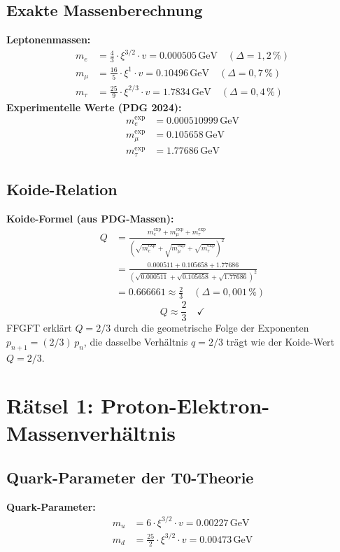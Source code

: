 	\subsection{Exakte Massenberechnung}
	\textbf{Leptonenmassen:}
	\begin{align}
		m_e &= \frac{4}{3} \cdot \xi^{3/2} \cdot v = 0.000505\,\si{\giga\electronvolt} \quad (\Delta = 1{,}2\,\%) \\
		m_\mu &= \frac{16}{5} \cdot \xi^{1} \cdot v = 0.10496\,\si{\giga\electronvolt} \quad (\Delta = 0{,}7\,\%) \\
		m_\tau &= \frac{25}{9} \cdot \xi^{2/3} \cdot v = 1.7834\,\si{\giga\electronvolt} \quad (\Delta = 0{,}4\,\%)
	\end{align}
	\textbf{Experimentelle Werte (PDG 2024):}
	\begin{align}
		m_e^{\text{exp}} &= 0.000510999\,\si{\giga\electronvolt} \\
		m_\mu^{\text{exp}} &= 0.105658\,\si{\giga\electronvolt} \\
		m_\tau^{\text{exp}} &= 1.77686\,\si{\giga\electronvolt}
	\end{align}
	\subsection{Koide-Relation}
	\textbf{Koide-Formel (aus PDG-Massen):}
	\begin{align}
		Q &= \frac{m_e^{\text{exp}} + m_\mu^{\text{exp}} + m_\tau^{\text{exp}}}{(\sqrt{m_e^{\text{exp}}} + \sqrt{m_\mu^{\text{exp}}} + \sqrt{m_\tau^{\text{exp}}})^2} \\
		&= \frac{0.000511 + 0.105658 + 1.77686}{(\sqrt{0.000511} + \sqrt{0.105658} + \sqrt{1.77686})^2} \\
		&= 0.666661 \approx \frac{2}{3} \quad (\Delta = 0{,}001\,\%)
	\end{align}
	\begin{equation}
		Q \approx \frac{2}{3} \quad \checkmark
	\end{equation}
	FFGFT erklärt $Q = 2/3$ durch die geometrische Folge der Exponenten
	$p_{n+1} = (2/3)\,p_n$, die dasselbe Verhältnis $q = 2/3$ trägt
	wie der Koide-Wert $Q = 2/3$.
	\section{Rätsel 1: Proton-Elektron-Massenverhältnis}
	\subsection{Quark-Parameter der T0-Theorie}
	\textbf{Quark-Parameter:}
	\begin{align}
		m_u &= 6 \cdot \xi^{3/2} \cdot v = 0.00227\,\si{\giga\electronvolt} \\
		m_d &= \frac{25}{2} \cdot \xi^{3/2} \cdot v = 0.00473\,\si{\giga\electronvolt}
	\end{align}
